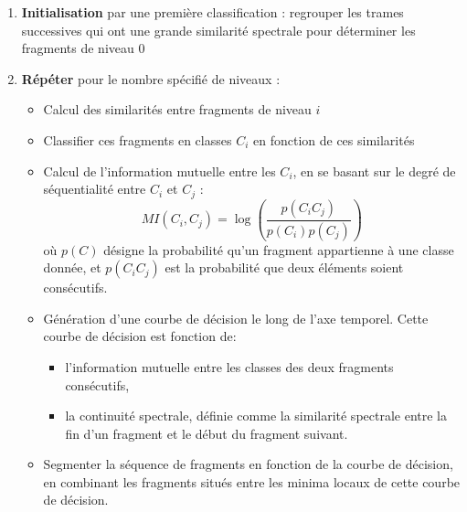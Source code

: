   \begin{enumerate}
    \item \textbf{Initialisation} par une première classification : regrouper les trames successives qui ont une grande similarité spectrale pour déterminer les fragments de niveau 0
    \item \textbf{Répéter} pour le nombre spécifié de niveaux :
    \begin{itemize}
      \item Calcul des similarités entre fragments de niveau $i$
      \item Classifier ces fragments en classes $C_i$ en fonction de ces similarités
      \item Calcul de l'information mutuelle entre les $C_i$, en se basant sur le degré de séquentialité entre $C_i$ et $C_j$ :
      \[ MI \left( C_i, C_j \right) = \log \left(\frac{p\left(C_iC_j\right)}{p\left(C_i\right)p\left(C_j\right)}\right) \]
      où $p(C)$ désigne la probabilité qu'un fragment appartienne à une classe donnée, et $p(C_iC_j)$ est la probabilité que deux éléments soient consécutifs.
      \item Génération d'une courbe de décision le long de l'axe temporel. Cette courbe de décision est fonction de:
      \begin{itemize}
        \item l'information mutuelle entre les classes des deux fragments consécutifs,
        \item la continuité spectrale, définie comme la similarité spectrale entre la fin d'un fragment et le début du fragment suivant.
      \end{itemize}
      \item Segmenter la séquence de fragments en fonction de la courbe de décision, en combinant les fragments situés entre les minima locaux de cette courbe de décision.
    \end{itemize}
  \end{enumerate}


